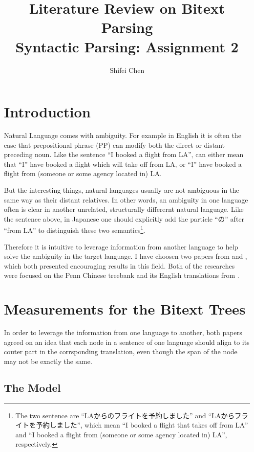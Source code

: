 \documentclass[11pt]{article} %
\title{{\LARGE Literature Review on Bitext Parsing}\\[1.5mm]Syntactic Parsing: Assignment 2\\} %
\author{Shifei Chen} %
\begin{document}
\maketitle

\section{Introduction}
Natural Language comes with ambiguity. For example in English it is often the case that prepositional phrase (PP) can modify both the direct or distant  preceding noun. Like the sentence ``I booked a flight from LA'', can either mean that ``I'' have booked a flight which will take off from LA, or ``I'' have booked a flight from (someone or some agency located in) LA.

But the interesting things, natural languages usually are not ambiguous in the same way \citep{Huang:2009:BSP:1699648.1699668} as their distant relatives. In other words, an ambiguity in one language often is clear in another unrelated, structurally differernt natural language. Like the sentence above, in Japanese one should explicitly add the particle ``の'' after ``from LA'' to distinguish these two semantics\footnote{The two sentence are ``LAからのフライトを予約しました'' and ``LAからフライトを予約しました'', which mean ``I booked a flight that takes off from LA'' and ``I booked a flight from (someone or some agency located in) LA'', respectively.}.

Therefore it is intuitive to leverage information from another language to help solve the ambiguity in the target language. I have choosen two papers from \cite{Burkett:2008:TLB:1613715.1613828} and \cite{Huang:2009:BSP:1699648.1699668}, which both presented encouraging results in this field. Both of the researches were focused on the Penn Chinese treebank and its English translations from \cite{xue2002building}.

\section{Measurements for the Bitext Trees}

In order to leverage the information from one language to another, both papers agreed on an idea that each node in a sentence of one language should align to its couter part in the corrsponding translation, even though the span of the node may not be exactly the same.

\subsection{The Model}
\end{document}
